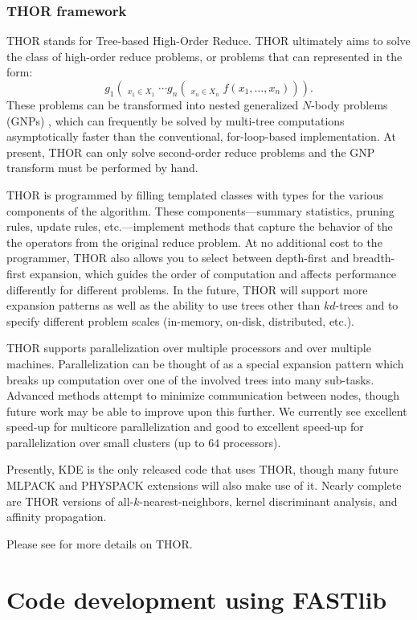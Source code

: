 \documentclass[letter]{report}
\begin{document}
\subsection{THOR framework}
THOR stands for Tree-based High-Order Reduce. THOR ultimately aims to
solve the class of high-order reduce problems, or problems that can
represented in the form:
\[g_1 \left( \mathop{\bigotimes\nolimits_{\!1}}_{x_1 \in X_1} \cdots g_n \left( \mathop{\bigotimes\nolimits_{\!n}}_{x_n \in X_n} f(x_1,\ldots,x_n) \right) \right) .\]
These problems can be transformed into nested generalized $N$-body
problems (GNPs) \cite{gray2000nbp}, which can frequently be solved
by multi-tree computations asymptotically faster than the
conventional, for-loop-based implementation.  At present, THOR can
only solve second-order reduce problems and the GNP transform must be
performed by hand.

THOR is programmed by filling templated classes with types for the
various components of the algorithm.  These components---summary
statistics, pruning rules, update rules, etc.---implement methods that
capture the behavior of the the operators from the original reduce
problem.  At no additional cost to the programmer, THOR also allows
you to select between depth-first and breadth-first expansion, which
guides the order of computation and affects performance differently
for different problems.  In the future, THOR will support more
expansion patterns as well as the ability to use trees other than
$kd$-trees and to specify different problem scales (in-memory,
on-disk, distributed, etc.).

THOR supports parallelization over multiple processors and over
multiple machines.  Parallelization can be thought of as a special
expansion pattern which breaks up computation over one of the involved
trees into many sub-tasks.  Advanced methods attempt to minimize
communication between nodes, though future work may be able to improve
upon this further.  We currently see excellent speed-up for multicore
parallelization and good to excellent speed-up for parallelization
over small clusters (up to 64 processors).

Presently, KDE is the only released code that uses THOR, though many
future MLPACK and PHYSPACK extensions will also make use of it.
Nearly complete are THOR versions of all-$k$-nearest-neighbors, kernel
discriminant analysis, and affinity propagation.

Please see \cite{boyer2007tho} for more details on THOR.

\chapter {Code development using FASTlib}
 
\end{document}
